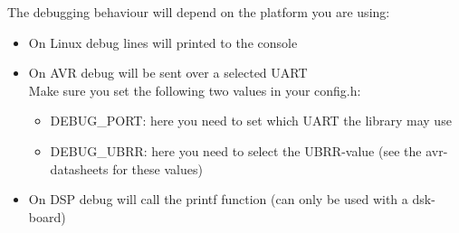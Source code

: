 The debugging behaviour will depend on the platform you are using:
\begin{itemize}
	\item{On Linux debug lines will printed to the console}
	\item{On AVR debug will be sent over a selected UART\\
		Make sure you set the following two values in your config.h:
		\begin{itemize}
			\item{DEBUG\_PORT: here you need to set which UART the library
				may use}
			\item{DEBUG\_UBRR: here you need to select the UBRR-value 
				(see the avr-datasheets for these values)}
		\end{itemize}
	}
	\item{On DSP debug will call the printf function 
		(can only be used with a dsk-board)}
\end{itemize}
